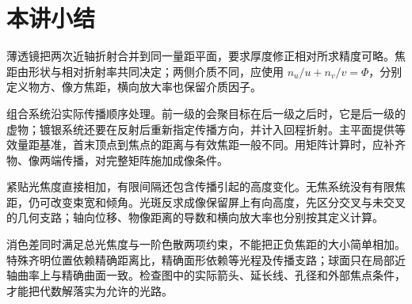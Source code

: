 \section{本讲小结}

薄透镜把两次近轴折射合并到同一量距平面，要求厚度修正相对所求精度可略。焦距由形状与相对折射率共同决定；两侧介质不同，应使用 $n_u/u+n_v/v=\Phi$，分别定义物方、像方焦距，横向放大率也保留介质因子。

组合系统沿实际传播顺序处理。前一级的会聚目标在后一级之后时，它是后一级的虚物；镀银系统还要在反射后重新指定传播方向，并计入回程折射。主平面提供等效量距基准，首末顶点到焦点的距离与有效焦距一般不同。用矩阵计算时，应补齐物、像两端传播，对完整矩阵施加成像条件。

紧贴光焦度直接相加，有限间隔还包含传播引起的高度变化。无焦系统没有有限焦距，仍可改变束宽和倾角。光斑反求成像保留屏上有向高度，先区分交叉与未交叉的几何支路；轴向位移、物像距离的导数和横向放大率也分别按其定义计算。

消色差同时满足总光焦度与一阶色散两项约束，不能把正负焦距的大小简单相加。特殊齐明位置依赖精确距离比，精确面形依赖等光程及传播支路；球面只在局部近轴曲率上与精确曲面一致。检查图中的实际箭头、延长线、孔径和外部焦点条件，才能把代数解落实为允许的光路。
